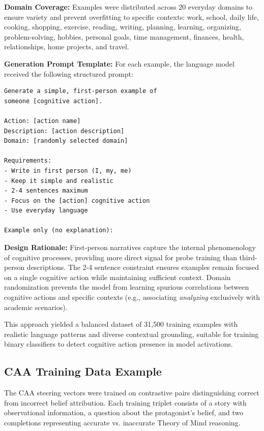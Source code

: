 \documentclass[letterpaper]{article}
\begin{document}
\textbf{Domain Coverage:} Examples were distributed across 20 everyday domains to ensure variety and prevent overfitting to specific contexts: work, school, daily life, cooking, shopping, exercise, reading, writing, planning, learning, organizing, problem-solving, hobbies, personal goals, time management, finances, health, relationships, home projects, and travel.

\textbf{Generation Prompt Template:} For each example, the language model received the following structured prompt:

\begin{verbatim}
Generate a simple, first-person example of
someone [cognitive action].

Action: [action name]
Description: [action description]
Domain: [randomly selected domain]

Requirements:
- Write in first person (I, my, me)
- Keep it simple and realistic
- 2-4 sentences maximum
- Focus on the [action] cognitive action
- Use everyday language

Example only (no explanation):
\end{verbatim}

\textbf{Design Rationale:} First-person narratives capture the internal phenomenology of cognitive processes, providing more direct signal for probe training than third-person descriptions. The 2-4 sentence constraint ensures examples remain focused on a single cognitive action while maintaining sufficient context. Domain randomization prevents the model from learning spurious correlations between cognitive actions and specific contexts (e.g., associating \textit{analyzing} exclusively with academic scenarios).

This approach yielded a balanced dataset of 31,500 training examples with realistic language patterns and diverse contextual grounding, suitable for training binary classifiers to detect cognitive action presence in model activations.


\subsection{CAA Training Data Example}

The CAA steering vectors were trained on contrastive pairs distinguishing correct from incorrect belief attribution. Each training triplet consists of a story with observational information, a question about the protagonist's belief, and two completions representing accurate vs. inaccurate Theory of Mind reasoning.
\end{document}
